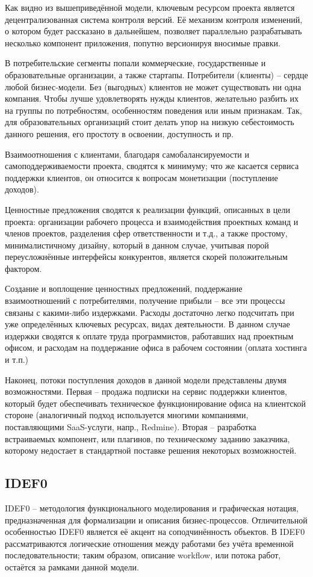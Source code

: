 \documentclass[a4paper, 14pt]{extarticle}
\begin{document}
Как видно из вышеприведённой модели, ключевым ресурсом проекта является децентрализованная система контроля версий. Её механизм контроля изменений, о котором будет рассказано в дальнейшем, позволяет параллельно разрабатывать несколько компонент приложения, попутно версионируя вносимые правки.

В потребительские сегменты попали коммерческие, государственные и образовательные организации, а также стартапы. Потребители (клиенты) – сердце любой бизнес-модели. Без (выгодных) клиентов не может существовать ни одна компания. Чтобы лучше удовлетворять нужды клиентов, желательно разбить их на группы по потребностям, особенностям поведения или иным признакам. Так, для образовательных организаций стоит делать упор на низкую себестоимость данного решения, его простоту в освоении, доступность и пр.

Взаимоотношения с клиентами, благодаря самобалансируемости и самоподдерживаемости проекта, сводятся к минимуму; что же касается сервиса поддержки клиентов, он относится к вопросам монетизации (поступление доходов).

Ценностные предложения сводятся к реализации функций, описанных в цели проекта: организации рабочего процесса и взаимодействия проектных команд и членов проектов, разделения сфер ответственности и т.д., а также простому, минималистичному дизайну, который в данном случае, учитывая порой переусложнённые интерфейсы конкурентов, является скорей положительным фактором.

Создание и воплощение ценностных предложений, поддержание взаимоотношений с потребителями, получение прибыли – все эти процессы связаны с какими-либо издержками. Расходы достаточно легко подсчитать при уже определённых ключевых ресурсах, видах деятельности. В данном случае издержки сводятся к оплате труда программистов, работавших над проектным офисом, и расходам на поддержание офиса в рабочем состоянии (оплата хостинга и т.п.)

Наконец, потоки поступления доходов в данной модели представлены двумя возможностями. Первая -- продажа подписки на сервис поддержки клиентов, который будет обеспечивать техническое функционирование офиса на клиентской стороне (аналогичный подход используется многими компаниями, поставляющими SaaS-услуги, напр., Redmine). Вторая -- разработка встраиваемых компонент, или плагинов, по техническому заданию заказчика, которому недостает в стандартной поставке решения некоторых возможностей.

\newpage


\subsection{IDEF0}
IDEF0 -- методология функционального моделирования и графическая нотация, предназначенная для формализации и описания бизнес-процессов. Отличительной особенностью IDEF0 является её акцент на соподчинённость объектов. В IDEF0 рассматриваются логические отношения между работами без учёта временной последовательности; таким образом, описание workflow, или потока работ, остаётся за рамками данной модели.
\end{document}
